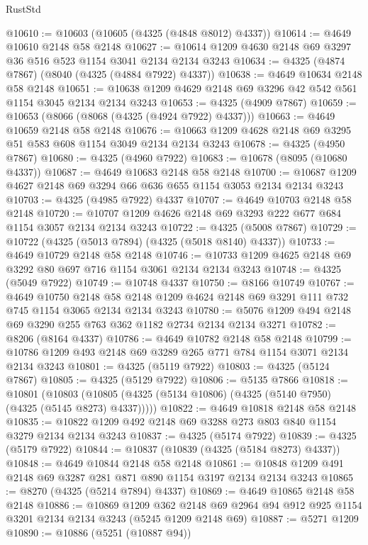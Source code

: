 \begin{lexlean}{RustStd}
\begin{coremodule}
@10610 := @10603 (@10605 (@4325 (@4848 @8012) @4337))
@10614 := @4649 @10610 @2148 @58 @2148
@10627 := @10614 @1209 @4630 @2148 @69 @3297 @36 @516 @523 @1154 @3041 @2134 @2134 @3243
@10634 := @4325 (@4874 @7867) (@8040 (@4325 (@4884 @7922) @4337))
@10638 := @4649 @10634 @2148 @58 @2148
@10651 := @10638 @1209 @4629 @2148 @69 @3296 @42 @542 @561 @1154 @3045 @2134 @2134 @3243
@10653 := @4325 (@4909 @7867)
@10659 := @10653 (@8066 (@8068 (@4325 (@4924 @7922) @4337)))
@10663 := @4649 @10659 @2148 @58 @2148
@10676 := @10663 @1209 @4628 @2148 @69 @3295 @51 @583 @608 @1154 @3049 @2134 @2134 @3243
@10678 := @4325 (@4950 @7867)
@10680 := @4325 (@4960 @7922)
@10683 := @10678 (@8095 (@10680 @4337))
@10687 := @4649 @10683 @2148 @58 @2148
@10700 := @10687 @1209 @4627 @2148 @69 @3294 @66 @636 @655 @1154 @3053 @2134 @2134 @3243
@10703 := @4325 (@4985 @7922) @4337
@10707 := @4649 @10703 @2148 @58 @2148
@10720 := @10707 @1209 @4626 @2148 @69 @3293 @222 @677 @684 @1154 @3057 @2134 @2134 @3243
@10722 := @4325 (@5008 @7867)
@10729 := @10722 (@4325 (@5013 @7894) (@4325 (@5018 @8140) @4337))
@10733 := @4649 @10729 @2148 @58 @2148
@10746 := @10733 @1209 @4625 @2148 @69 @3292 @80 @697 @716 @1154 @3061 @2134 @2134 @3243
@10748 := @4325 (@5049 @7922)
@10749 := @10748 @4337
@10750 := @8166 @10749
@10767 := @4649
    @10750
    @2148
    @58
    @2148
    @1209
    @4624
    @2148
    @69
    @3291
    @111
    @732
    @745
    @1154
    @3065
    @2134
    @2134
    @3243
@10780 := @5076 @1209 @494 @2148 @69 @3290 @255 @763 @362 @1182 @2734 @2134 @2134 @3271
@10782 := @8206 (@8164 @4337)
@10786 := @4649 @10782 @2148 @58 @2148
@10799 := @10786 @1209 @493 @2148 @69 @3289 @265 @771 @784 @1154 @3071 @2134 @2134 @3243
@10801 := @4325 (@5119 @7922)
@10803 := @4325 (@5124 @7867)
@10805 := @4325 (@5129 @7922)
@10806 := @5135 @7866
@10818 := @10801
    (@10803 (@10805 (@4325 (@5134 @10806) (@4325 (@5140 @7950) (@4325 (@5145 @8273) @4337)))))
@10822 := @4649 @10818 @2148 @58 @2148
@10835 := @10822 @1209 @492 @2148 @69 @3288 @273 @803 @840 @1154 @3279 @2134 @2134 @3243
@10837 := @4325 (@5174 @7922)
@10839 := @4325 (@5179 @7922)
@10844 := @10837 (@10839 (@4325 (@5184 @8273) @4337))
@10848 := @4649 @10844 @2148 @58 @2148
@10861 := @10848 @1209 @491 @2148 @69 @3287 @281 @871 @890 @1154 @3197 @2134 @2134 @3243
@10865 := @8270 (@4325 (@5214 @7894) @4337)
@10869 := @4649 @10865 @2148 @58 @2148
@10886 := @10869
    @1209
    @362
    @2148
    @69
    @2964
    @94
    @912
    @925
    @1154
    @3201
    @2134
    @2134
    @3243
    (@5245 @1209 @2148 @69)
@10887 := @5271 @1209
@10890 := @10886 (@5251 (@10887 @94))

\end{coremodule}
\end{lexlean}
